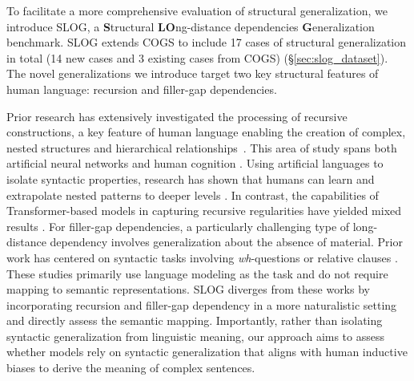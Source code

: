 To facilitate a more comprehensive evaluation of structural generalization, we introduce SLOG, a \textbf{S}tructural \textbf{LO}ng-distance dependencies \textbf{G}eneralization benchmark. SLOG extends COGS to include 17 cases of structural generalization in total (14 new cases and 3 existing cases from COGS) (\S\ref{sec:slog_dataset}). The novel generalizations we introduce target two key structural features of human language: recursion and filler-gap dependencies.

Prior research has extensively investigated the processing of recursive constructions, a key feature of human language enabling the creation of complex, nested structures and hierarchical relationships~\citep{hauser2002faculty}. This area of study spans both artificial neural networks and human cognition .
Using artificial languages to isolate syntactic properties, research has shown that humans can learn and extrapolate nested patterns to deeper levels \citep{mccoy2021infinite}. In contrast, the capabilities of Transformer-based models in capturing recursive regularities have yielded mixed results \citep{bhattamishra-etal-2020-ability,hahn:2020,ebrahimi-etal-2020-self,lakretz2021can}. For filler-gap dependencies, a particularly challenging type of long-distance dependency involves generalization about the absence of material. Prior work has centered on syntactic tasks involving \textit{wh}-questions or relative clauses . These studies primarily use language modeling as the task and do not 
require mapping to semantic representations. SLOG diverges from these works by incorporating recursion and filler-gap dependency in a more naturalistic setting and directly assess the semantic mapping. Importantly, rather than isolating syntactic generalization from linguistic meaning, our approach aims to assess whether models rely on syntactic generalization that aligns with human inductive biases to derive the meaning of complex sentences.

